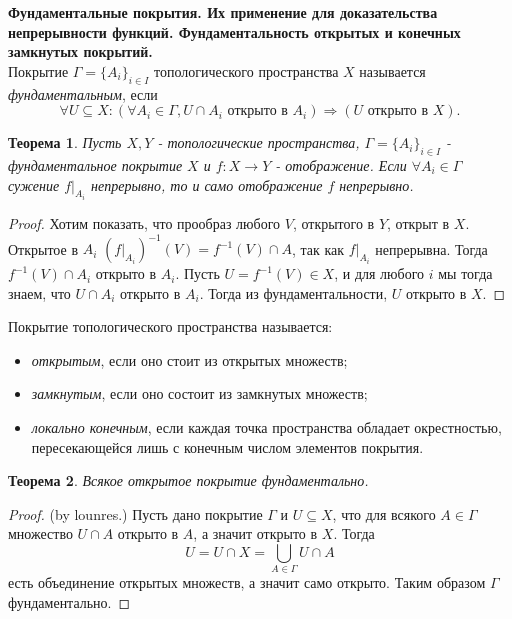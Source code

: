\documentclass[a4paper,100pt]{article}
\theoremstyle{indented}
\newtheorem{theorem}{Теорема}
\begin{document}
\medskip

\textbf{Фундаментальные покрытия. Их применение для доказательства непрерывности функций. Фундаментальность открытых и конечных замкнутых покрытий.}\\

Покрытие $\Gamma = \{A_i\}_{i\in I}$ топологического пространства $X$ называется \textit{фундаментальным}, если 
\[
    \forall U\subseteq X : (\forall A_i \in \Gamma, U\cap A_i \text{ открыто в } A_i) \Rightarrow (U \text{ открыто в } X).
\] 

\begin{theorem}
    Пусть $X, Y$ - топологические пространства, $\Gamma = \{A_i\}_{i\in I}$ - фундаментальное покрытие $X$ и $f: X\rightarrow Y$ - отображение. Если $\forall A_i \in \Gamma$ сужение $f |_{A_i}$ непрерывно, то и само отображение $f$ непрерывно.
\end{theorem}

\begin{proof}
    Хотим показать, что прообраз любого $V$, открытого в $Y$, открыт в $X$. Открытое в $A_i$ $(f|_{A_i})^{-1}(V)=f^{-1}(V)\cap A$, так как $f|_{A_i}$ непрерывна. Тогда $f^{-1}(V)\cap A_i$ открыто в $A_i$. Пусть $U = f^{-1}(V)\in X$, и для любого $i$ мы тогда знаем, что $U\cap A_i$ открыто в $A_i$. Тогда из фундаментальности, $U$ открыто в $X$.
\end{proof}

Покрытие топологического пространства называется:
\begin{itemize}
    \item \textit{открытым}, если оно стоит из открытых множеств;
    \item \textit{замкнутым}, если оно состоит из замкнутых множеств;
    \item \textit{локально конечным}, если каждая точка пространства обладает окрестностью, пересекающейся лишь с конечным числом элементов покрытия.
\end{itemize}

\begin{theorem}
    Всякое открытое покрытие фундаментально.
\end{theorem}

\begin{proof}
    \textrm(by lounres.) Пусть дано покрытие $\Gamma$ и $U \subseteq X$, что для всякого $A \in \Gamma$ множество $U \cap A$ открыто в $A$, а значит открыто в $X$. Тогда
        \[
            U = U \cap X = \bigcup_{A \in \Gamma} U \cap A
        \]
    есть объединение открытых множеств, а значит само открыто. Таким образом $\Gamma$ фундаментально.
\end{proof}
\end{document}
